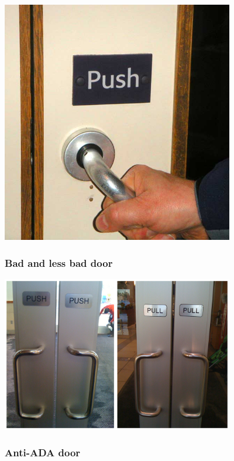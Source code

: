 \begin{center}
  \includegraphics[width=4.0in]{fiDoorPull.jpg}
\end{center}

\hypertarget{bad-and-less-bad-door}{%
\subsubsection{Bad and less bad door}\label{bad-and-less-bad-door}}

\begin{center}
  \includegraphics[width=4.0in]{fiPushPull.jpg}
\end{center}

\hypertarget{anti-ada-door}{%
\subsubsection{Anti-ADA door}\label{anti-ada-door}}

